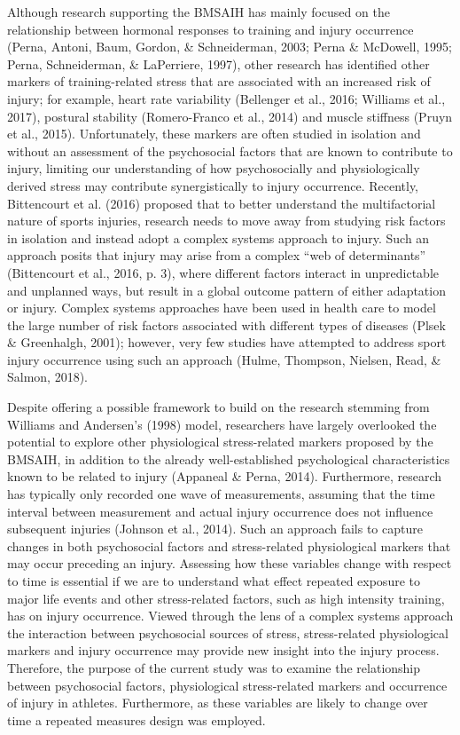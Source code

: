 \documentclass[man,floatsintext]{apa6}
\begin{document}
Although research supporting the BMSAIH has mainly focused on the relationship between hormonal responses to training and injury occurrence (Perna, Antoni, Baum, Gordon, \& Schneiderman, 2003; Perna \& McDowell, 1995; Perna, Schneiderman, \& LaPerriere, 1997), other research has identified other markers of training-related stress that are associated with an increased risk of injury; for example,
heart rate variability (Bellenger et al., 2016; Williams et al., 2017),
postural stability (Romero-Franco et al., 2014)
and muscle stiffness (Pruyn et al., 2015).
Unfortunately, these markers are often studied in isolation and without an assessment of the psychosocial factors that are known to contribute to injury, limiting our understanding of how psychosocially and physiologically derived stress may contribute synergistically to injury occurrence.
Recently, Bittencourt et al. (2016)
proposed that to better understand the multifactorial nature of sports injuries, research needs to move away from studying risk factors in isolation and instead adopt a complex systems approach to injury.
Such an approach posits that injury may arise from a complex \enquote{web of determinants} (Bittencourt et al., 2016, p. 3),
where different factors interact in unpredictable and unplanned ways, but result in a global outcome pattern of either adaptation or injury.
Complex systems approaches have been used in health care to model the large number of risk factors associated with different types of diseases (Plsek \& Greenhalgh, 2001);
however, very few studies have attempted to address sport injury occurrence using such an approach (Hulme, Thompson, Nielsen, Read, \& Salmon, 2018).

Despite offering a possible framework to build on the research stemming from Williams and Andersen's (1998) model, researchers have largely overlooked the potential to explore other physiological stress-related markers proposed by the BMSAIH, in addition to the already well-established psychological characteristics known to be related to injury (Appaneal \& Perna, 2014).
Furthermore, research has typically only recorded one wave of measurements, assuming that the time interval between measurement and actual injury occurrence does not influence subsequent injuries (Johnson et al., 2014).
Such an approach fails to capture changes in both psychosocial factors and stress-related physiological markers that may occur preceding an injury.
Assessing how these variables change with respect to time is essential if we are to understand what effect repeated exposure to major life events and other stress-related factors, such as high intensity training, has on injury occurrence.
Viewed through the lens of a complex systems approach the interaction between psychosocial sources of stress, stress-related physiological markers and injury occurrence may provide new insight into the injury process.
Therefore, the purpose of the current study was to examine the relationship between psychosocial factors, physiological stress-related markers and occurrence of injury in athletes.
Furthermore, as these variables are likely to change over time a repeated measures design was employed.
\end{document}
